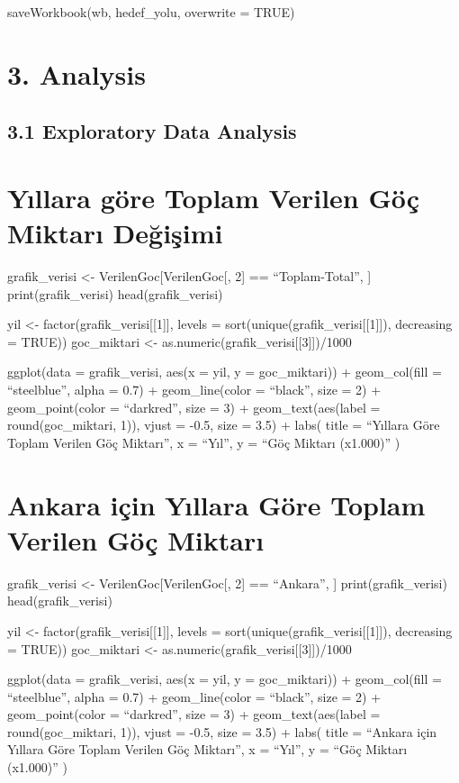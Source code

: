 \documentclass[
  11pt,
  a4paper,
  DIV=11,
  numbers=noendperiod]{scrartcl}
\begin{document}
saveWorkbook(wb, hedef\_yolu, overwrite = TRUE)

\section{3. Analysis}\label{analysis}

\subsection{3.1 Exploratory Data
Analysis}\label{exploratory-data-analysis}

\section{Yıllara göre Toplam Verilen Göç Miktarı
Değişimi}\label{yux131llara-guxf6re-toplam-verilen-guxf6uxe7-miktarux131-deux11fiux15fimi}

grafik\_verisi \textless- VerilenGoc{[}VerilenGoc{[}, 2{]} ==
``Toplam-Total'', {]} print(grafik\_verisi) head(grafik\_verisi)

yil \textless- factor(grafik\_verisi{[}{[}1{]}{]}, levels =
sort(unique(grafik\_verisi{[}{[}1{]}{]}), decreasing = TRUE))
goc\_miktari \textless- as.numeric(grafik\_verisi{[}{[}3{]}{]})/1000

ggplot(data = grafik\_verisi, aes(x = yil, y = goc\_miktari)) +
geom\_col(fill = ``steelblue'', alpha = 0.7) + geom\_line(color =
``black'', size = 2) + geom\_point(color = ``darkred'', size = 3) +
geom\_text(aes(label = round(goc\_miktari, 1)), vjust = -0.5, size =
3.5) + labs( title = ``Yıllara Göre Toplam Verilen Göç Miktarı'', x =
``Yıl'', y = ``Göç Miktarı (x1.000)'' )

\section{Ankara için Yıllara Göre Toplam Verilen Göç
Miktarı}\label{ankara-iuxe7in-yux131llara-guxf6re-toplam-verilen-guxf6uxe7-miktarux131}

grafik\_verisi \textless- VerilenGoc{[}VerilenGoc{[}, 2{]} ==
``Ankara'', {]} print(grafik\_verisi) head(grafik\_verisi)

yil \textless- factor(grafik\_verisi{[}{[}1{]}{]}, levels =
sort(unique(grafik\_verisi{[}{[}1{]}{]}), decreasing = TRUE))
goc\_miktari \textless- as.numeric(grafik\_verisi{[}{[}3{]}{]})/1000

ggplot(data = grafik\_verisi, aes(x = yil, y = goc\_miktari)) +
geom\_col(fill = ``steelblue'', alpha = 0.7) + geom\_line(color =
``black'', size = 2) + geom\_point(color = ``darkred'', size = 3) +
geom\_text(aes(label = round(goc\_miktari, 1)), vjust = -0.5, size =
3.5) + labs( title = ``Ankara için Yıllara Göre Toplam Verilen Göç
Miktarı'', x = ``Yıl'', y = ``Göç Miktarı (x1.000)'' )
\end{document}
